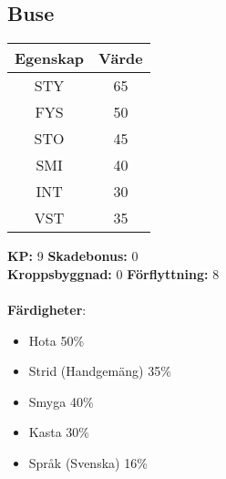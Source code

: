 \subsection{Buse}
\label{var:Buse}
%
\begin{center}
	\begin{tabular}{ | c | c | }
		\hline
		Egenskap & Värde \\
		\hline
		STY & 65 \\
		FYS & 50 \\
		STO & 45 \\
		SMI & 40 \\
		INT & 30 \\
		VST & 35 \\
		\hline
	\end{tabular}
\end{center}
%
\textbf{KP:} 9 \quad \textbf{Skadebonus:} 0 \\
\textbf{Kroppsbyggnad:} 0 \quad \textbf{Förflyttning:} 8 \\
\\
\textbf{Färdigheter}:
\begin{itemize}
	\item Hota 50\%
	\item Strid (Handgemäng) 35\%
	\item Smyga 40\%
	\item Kasta 30\%
	\item Språk (Svenska) 16\%
\end{itemize}

